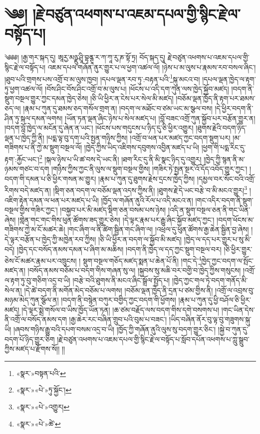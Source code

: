 \chapter{༄༅། །རྗེ་བཙུན་འཕགས་པ་འཇམ་དཔལ་གྱི་སྙིང་རྗེ་ལ་བསྟོད་པ།}༄༅༅། །རྒྱ་གར་སྐད་དུ། ཨཱརྱ་མཉྫུ་ཤྲཱི་བྷནྚཱ་ར་ཀ་ཀཱ་རུ་ཎ་སྟོ་ཏྲ། བོད་སྐད་དུ། རྗེ་བཙུན་འཕགས་པ་འཇམ་དཔལ་གྱི་སྙིང་རྗེ་ལ་བསྟོད་པ། འཇམ་དཔལ་གཞོན་ནུར་གྱུར་པ་ལ་ཕྱག་འཚལ་ལོ། །ཉེས་པ་མ་ལུས་པ་རྣམས་རབ་བསལ་ཞིང་། །ཐུབ་པའི་གྲགས་པས་འགྲོ་བ་མ་ལུས་ཁྱབ། །དཔལ་ལྡན་རབ་ཏུ་:བརྟན་པའི་\footnote{«སྣར་»བསྟན་པའི་}སྐུ་མངའ་བ། །དཔལ་ལྡན་ཁྱེད་ལ་རྟག་ཏུ་ཕྱག་འཚལ་ལོ། །བོས་ཤིང་བོས་ཤིང་འགྲོ་བ་མ་ལུས་པ། །ཕོངས་པ་འདི་དག་ཀུན་ལས་ཁྱེད་སྐྱོབ་མཛད། །བདག་ནི་སྡུག་བསྔལ་གྱུར་ཀྱང་དམན་ཁྱེད་ཅེས། །ཅི་ཡི་ཕྱིར་ན་ངེས་པར་སེལ་མི་མཛད། །བཅོམ་ལྡན་ཁྱོད་ནི་རྟག་པར་ཐམས་ཅད་ལ། །རྣམ་པ་ཀུན་དུ་ཐམས་ཅད་གསོལ་གྲག་ན། །བདག་ལ་མཐོང་བ་ཙམ་ཡང་མ་སྩལ་བས། །དེ་ཕྱིར་བདག་ནི་ཤིན་ཏུ་སྐལ་དམན་ལགས། །ཡོན་ཏན་ལྡན་ཞིང་ཉེས་པ་སེལ་མཛད་པ། །བློ་བཟང་འགྲོ་ཀུན་སྐྱོབ་པར་བརྩོན་གྱུར་ན། །བདག་བློ་ཁྱེད་ལ་མངོན་དུ་ཞེན་ན་ཡང་། །ཕོངས་པས་གདུངས་པ་ཉིད་དུ་ཅི་ཕྱིར་འགྱུར། །ཐུགས་རྗེའི་བདག་ཉིད་ལྡན་པ་ཁྱེད་ཀྱི་ནི། །པདྨ་ལྟ་བུ་དག་པའི་སྤྱན་གཉིས་ཀྱིས། །འགྲོ་བ་ཕན་པར་མཛད་ཀྱང་བདག་སྡུག་པར། །མ་གཟིགས་པ་ནི་ཀྱེ་མ་སྡུག་བསྔལ་ལོ། །ཁྱེད་ཀྱིས་ཡིད་འཇིགས་དབུགས་འབྱིན་མཛད་པ་ཡི། །ཕྱག་གི་པདྨ་རིང་དུ་རྟག་:རྐྱོང་ཡང་།\footnote{«སྣར་»«པེ་»ཏུ་སྐྱོང་།} །སྐལ་ཉེས་པ་ཡི་ཚ་བས་དེ་ཡང་ནི། །ཐག་རིང་དུ་ནི་མི་སྣང་ཉིད་དུ་འགྱུར། །ཁྱེད་ཀྱི་སྙན་ནི་མ་ཉམས་གཙང་བ་དག །གཉིས་ཀྱིས་ཀྱང་ནི་ལུས་ལ་སྡུག་བསྔལ་གྱིས། །གཟིར་ཏེ་སྤྱན་སྔར་འོ་དོད་འབོད་གྱུར་ཀྱང་། །བདག་གི་དམན་པ་ཅི་ཕྱིར་གསན་མ་གྱུར། །རྣམ་པ་ཀུན་དུ་ཐུགས་རྗེས་དྲངས་ཁྱེད་ཀྱིས། །དམྱལ་བར་སོང་བའི་འགྲོ་རིགས་བདེ་མཛད་ན། །སྡིག་ཅན་བདག་ལ་བཅོམ་ལྡན་འདས་ཀྱིས་ནི། །ཐུགས་རྗེ་དེ་ཡང་བརྩེ་བ་མི་མངའ་གྱུར།\footnote{«སྣར་»«པེ་»འགྱུར།} །འཇིག་རྟེན་དམན་ལ་ཕན་པར་མཛད་པ་ཡི། །ཁྱོད་ལ་གཞོན་ནུའི་རོལ་པ་འདི་མངའ་ན། །གང་འདིར་བདག་ནི་སྡུག་བསྔལ་གྱིས་གཟིར་ཀྱང་། །བསྐྱབ་པར་མི་མཛད་སྡིག་ཅན་བསམ་པས་ཉེས། །འདི་ན་སྡུག་བསྔལ་ཅན་ནི་གང་ཡིན་ཞེས། །གླེན་གང་གང་གིས་ཕུན་ཚོགས་ཟད་གྱུར་ཅེས། །དེ་ལྟར་རྣམ་པར་རྒྱུ་ཞིང་སྐྱོབ་མཛད་ཀྱང་། །བདག་ཕོངས་མ་གཟིགས་ཀྱེ་མ་ངོ་མཚར་ཆེ། །གང་ཞིག་ལ་ནི་ཚིག་སྦྱིན་གང་ཞིག་ལ། །འཕྲལ་དུ་ཕུན་ཚོགས་རྒྱ་ཆེན་སྦྱིན་བྱ་ཞེས། །དེ་ལྟར་བརྩོན་པ་ཁྱེད་ཀྱི་མཁྱེན་རབ་ཀྱིས། །ཅི་ཡི་ཕྱིར་ན་བདག་ལ་སྐྱོབ་མི་མཛད། །ཁྱེད་ལ་དད་པར་གྱུར་པ་སུ་མི་བདེ། །ཁྱེད་དང་བསོད་ནམས་དམན་པ་ཞིག་མ་མཆིས། །བདག་ནི་ཁྱེད་ལ་དད་ཀྱང་སྡུག་བསྔལ་བར། །ཅི་ཕྱིར་གྱུར་ཅེས་ངོ་མཚར་རྣམ་པར་འཁྲུངས། །
སྡུག་བསྔལ་གཅོད་མཛད་སྨན་པ་ཆེན་པོ་ནི། །གང་དེ་\footnote{«སྣར་»«པེ་»ཚེ་}ཁྱེད་ཀྱང་བདག་ལ་སྤོང་མཛད་ན། །བསོད་ནམས་བཅོམ་པ་བདག་གིས་གཞན་སུ་ལ། །སྐྱབས་སུ་མཆི་བར་བགྱི་བ་ཁྱེད་ཀྱིས་གསུངས། །འགྲོ་ལ་རྟག་ཏུ་བུ་གཅིག་འདྲ་བ་ཡི། །བརྩེ་བའི་ཐུགས་ནི་མངའ་ཞིང་སྒྲོལ་སྤྱོད་པ། །ཁྱེད་ཀྱང་གལ་ཏེ་བདག་གནོད་མི་སེལ་ན། །དེ་ཚེ་བདག་ནི་མགོན་མེད་བཅོམ་པ་ལགས། །བཅོམ་ལྡན་ཁྱེད་ནི་དྲན་པ་ཙམ་གྱིས་ནི། །འགྲོ་ལ་འབྲས་བུ་མཉམ་མེད་ཀུན་སྩོལ་ན། །བདག་ནི་བསྙེན་བཀུར་བགྱིད་ཀྱང་བདག་གི་ཕྱོགས། །རྣམ་པ་ཀུན་དུ་ཕྱི་བཤོལ་ཅི་ཕྱིར་མཛད། །དེ་ལྟར་སྨྲེ་གསོལ་བ་ཡིས་ཁྱོད་ཡོན་ཏན། །ཆ་ཙམ་བརྗོད་ལས་བདག་གིས་དགེ་བསགས་པ། །གང་ཡིན་དེས་ནི་འགྲོ་ལ་བསོད་ནམས་དག །རྒྱ་ཆེར་རང་བཞིན་གྲུབ་པའི་བུམ་པ་བཟང་། །ཡིད་བཞིན་ནོར་བུ་ལྟ་བུ་གཟུགས་སྐུ་ཡི། །ཞབས་གཉིས་རྒྱུ་བའི་དཔག་བསམ་འདྲ་བ་ཡི། །ཁྱོད་ཀྱི་གཞོན་ནུའི་ལུས་སུ་བདག་གྱུར་ཅིང་། །སྐྱེ་བ་ཀུན་དུ་བདག་པོ་ཉིད་གྱུར་ཅིག །རྗེ་བཙུན་འཕགས་པ་འཇམ་དཔལ་གྱི་སྙིང་རྗེ་ལ་བསྟོད་པ་སློབ་དཔོན་འཕགས་པ་ཀླུ་སྒྲུབ་ཀྱིས་མཛད་པ་རྫོགས་སོ།། །།